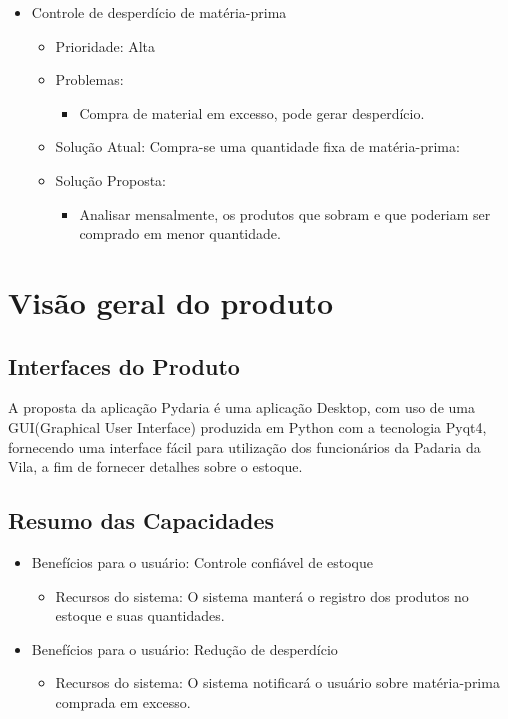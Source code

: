 \begin{appendices}
\begin{itemize}
\item Controle de desperdício de matéria-prima

	\begin{itemize}
		\item Prioridade: Alta
		\item Problemas:
			\begin{itemize}
			\item Compra de material em excesso, pode gerar desperdício.
			\end{itemize}
		\item Solução Atual: Compra-se uma quantidade fixa de matéria-prima:
		\item Solução Proposta:
			\begin{itemize}
				\item Analisar mensalmente, os produtos que sobram e que poderiam ser comprado em menor quantidade.
			\end{itemize}
	\end{itemize}

\end{itemize}

\section{Visão geral do produto}

\subsection{Interfaces do Produto}
	A proposta da aplicação Pydaria é uma aplicação Desktop, com uso de uma GUI(Graphical User Interface) produzida em Python com a tecnologia Pyqt4, fornecendo uma interface fácil para utilização dos funcionários da Padaria da Vila, a fim de fornecer detalhes sobre o estoque.

\subsection{Resumo das Capacidades}
	\begin{itemize}
	\item Benefícios para o usuário: Controle confiável de estoque
		\begin{itemize}
			\item Recursos do sistema: O sistema manterá o registro dos produtos no estoque e suas quantidades.
		\end{itemize}

	\item Benefícios para o usuário: Redução de desperdício
		\begin{itemize}
			\item Recursos do sistema: O sistema notificará o usuário sobre matéria-prima comprada em excesso.
		\end{itemize}


\end{itemize}
\end{appendices}
